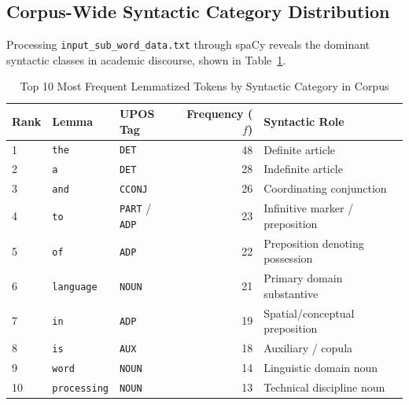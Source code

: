 \subsection{Corpus-Wide Syntactic Category Distribution}
Processing \texttt{input\_sub\_word\_data.txt} through spaCy reveals the dominant syntactic classes in academic discourse, shown in Table~\ref{tab:exp5_corpus_pos}.
\begin{table}[H]
\centering
\small
\caption{Top 10 Most Frequent Lemmatized Tokens by Syntactic Category in Corpus}
\label{tab:exp5_corpus_pos}
\begin{tabular}{lllrp{6cm}}
\toprule
\textbf{Rank} & \textbf{Lemma} & \textbf{UPOS Tag} & \textbf{Frequency ($f$)} & \textbf{Syntactic Role} \\
\midrule
1 & \texttt{the} & \texttt{DET} & 48 & Definite article \\
2 & \texttt{a} & \texttt{DET} & 28 & Indefinite article \\
3 & \texttt{and} & \texttt{CCONJ} & 26 & Coordinating conjunction \\
4 & \texttt{to} & \texttt{PART} / \texttt{ADP} & 23 & Infinitive marker / preposition \\
5 & \texttt{of} & \texttt{ADP} & 22 & Preposition denoting possession \\
6 & \texttt{language} & \texttt{NOUN} & 21 & Primary domain substantive \\
7 & \texttt{in} & \texttt{ADP} & 19 & Spatial/conceptual preposition \\
8 & \texttt{is} & \texttt{AUX} & 18 & Auxiliary / copula \\
9 & \texttt{word} & \texttt{NOUN} & 14 & Linguistic domain noun \\
10 & \texttt{processing} & \texttt{NOUN} & 13 & Technical discipline noun \\
\bottomrule
\end{tabular}
\end{table}

